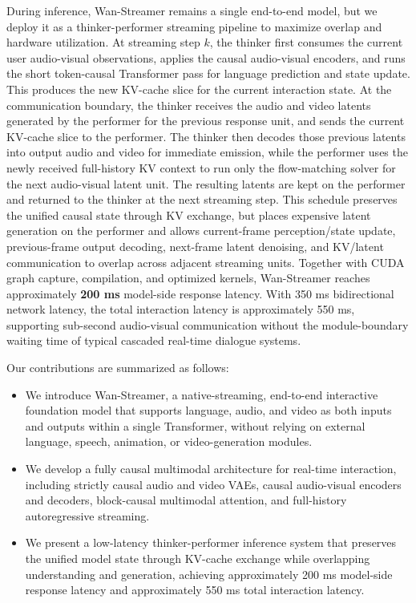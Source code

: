 \documentclass{llmxive}
\begin{document}
During inference, Wan-Streamer remains a single end-to-end model, but we deploy it as a thinker-performer streaming pipeline to maximize overlap and hardware utilization. At streaming step $k$, the thinker first consumes the current user audio-visual observations, applies the causal audio-visual encoders, and runs the short token-causal Transformer pass for language prediction and state update. This produces the new KV-cache slice for the current interaction state. At the communication boundary, the thinker receives the audio and video latents generated by the performer for the previous response unit, and sends the current KV-cache slice to the performer. The thinker then decodes those previous latents into output audio and video for immediate emission, while the performer uses the newly received full-history KV context to run only the flow-matching solver for the next audio-visual latent unit. The resulting latents are kept on the performer and returned to the thinker at the next streaming step. This schedule preserves the unified causal state through KV exchange, but places expensive latent generation on the performer and allows current-frame perception/state update, previous-frame output decoding, next-frame latent denoising, and KV/latent communication to overlap across adjacent streaming units. Together with CUDA graph capture, compilation, and optimized kernels, Wan-Streamer reaches approximately \textbf{200 ms} model-side response latency. With 350 ms bidirectional network latency, the total interaction latency is approximately 550 ms, supporting sub-second audio-visual communication without the module-boundary waiting time of typical cascaded real-time dialogue systems.

Our contributions are summarized as follows:
\begin{itemize}
    \item We introduce Wan-Streamer, a native-streaming, end-to-end interactive foundation model that supports language, audio, and video as both inputs and outputs within a single Transformer, without relying on external language, speech, animation, or video-generation modules.
    \item We develop a fully causal multimodal architecture for real-time interaction, including strictly causal audio and video VAEs, causal audio-visual encoders and decoders, block-causal multimodal attention, and full-history autoregressive streaming.
    \item We present a low-latency thinker-performer inference system that preserves the unified model state through KV-cache exchange while overlapping understanding and generation, achieving approximately 200 ms model-side response latency and approximately 550 ms total interaction latency.
\end{itemize}
\end{document}
